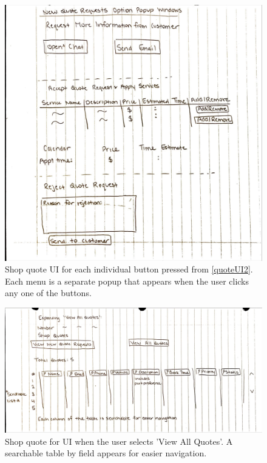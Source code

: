 \documentclass[12pt, titlepage]{article}
\begin{document}
\begin{figure}[H]
    \centering
    \includegraphics[width=\textwidth]{Design/SystDesign/Quotes/Quote3.png}
    \caption{Shop quote UI for each individual button pressed from \ref{quoteUI2}. Each menu is a separate popup that appears when the user clicks any one of the buttons.}
    \label{fig:quoteUI3}
\end{figure}

\begin{figure}[H]
    \centering
    \includegraphics[width=\textwidth]{Design/SystDesign/Quotes/Quote4.png}
    \caption{Shop quote for UI when the user selects 'View All Quotes'. A searchable table by field appears for easier navigation.}
    \label{fig:quoteUI4}
\end{figure}
\end{document}
